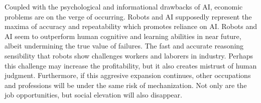 \documentclass[man]{apa6}
\begin{document}
Coupled with the psychological and informational drawbacks of AI, economic problems are on the verge of occurring. Robots and AI supposedly represent the maxima of accuracy and repeatability which promotes reliance on AI. Robots and AI seem to outperform human cognitive and learning abilities in near future, albeit undermining the true value of failures. The fast and accurate reasoning sensibility that robots show challenges workers and laborers in industry. Perhaps this challenge may increase the profitability, but it also creates mistrust of human judgment. Furthermore, if this aggresive expansion continues, other occupations and professions will be under the same risk of mechanization. Not only are the job opportunities, but social elevation will also disappear. \par


\end{document}
